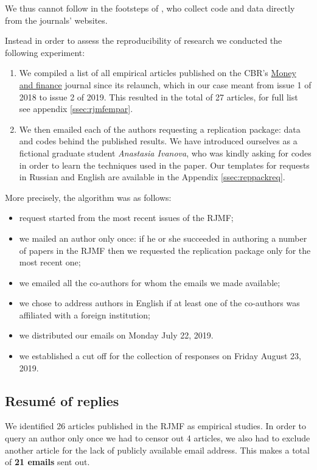 \documentclass[12pt]{article}
\begin{document}
We thus cannot follow in the footsteps of \cite{gertler2018make}, who collect code and data directly from the journals' websites. 

Instead in order to assess the reproducibility of research we conducted the following experiment: 
\begin{enumerate}
    \item We compiled a list of all empirical articles published on the CBR's \href{https://rjmf.econs.online/}{Money and finance} journal since its relaunch, which in our case meant from issue 1 of 2018 to issue 2 of 2019. This resulted in the total of 27 articles, for full list see appendix \ref{ssec:rjmfempar}.
    \item We then emailed each of the authors requesting a replication package: data and codes behind the published results. We have introduced ourselves as a fictional graduate student {\it Anastasia Ivanova}, who was kindly asking for codes in order to learn the techniques used in the paper. Our templates for requests in Russian and English are available in the Appendix \ref{ssec:reppackreq}.
\end{enumerate}

More precisely, the algorithm was as follows: 
\begin{itemize}
    \item request started from the most recent issues of the RJMF;
	\item we mailed an author only once: if he or she succeeded in authoring a number of papers in the RJMF then we requested the replication package only for the most recent one;
	\item we emailed all the co-authors for whom the emails we made available; 
	\item we chose to address authors in English if at least one of the co-authors was affiliated with a foreign institution;
	\item we distributed our emails on Monday July 22, 2019.
	\item we established a cut off for the collection of responses on Friday August 23, 2019.
\end{itemize}

\subsection{Resum\'{e} of replies}

We identified 26 articles published in the RJMF as empirical studies. In order to query an author only once we had to censor out 4 articles, we also had to exclude another article for the lack of publicly available email address. This makes a total of {\bf 21 emails} sent out. 
\end{document}
